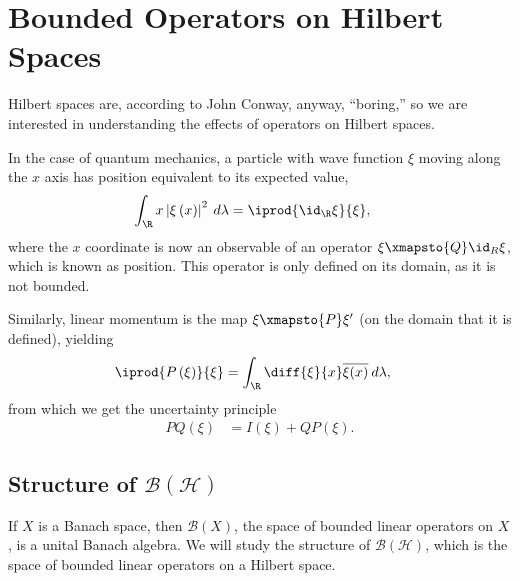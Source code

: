 \documentclass[10pt]{mypackage}
\begin{document}
\section{Bounded Operators on Hilbert Spaces}%
Hilbert spaces are, according to John Conway, anyway, ``boring,'' so we are interested in understanding the effects of operators on Hilbert spaces.\newline

In the case of quantum mechanics, a particle with wave function $\xi$ moving along the $x$ axis has position equivalent to its expected value,
\begin{align*}
  \int_{\R}^{} x \left\vert \xi\left(x\right) \right\vert^2\:d\lambda &= \iprod{\id_{\R} \xi}{\xi},
\end{align*}
where the $x$ coordinate is now an observable of an operator $\xi\xmapsto{Q} \id_{R}\xi$, which is known as position. This operator is only defined on its domain, as it is not bounded.\newline

Similarly, linear momentum is the map $\xi\xmapsto{P} \xi'$ (on the domain that it is defined), yielding
\begin{align*}
  \iprod{P\left(\xi\right)}{\xi} &= \int_{\R}^{} \diff{\xi}{x}\overline{\xi(x)}\:d\lambda,
\end{align*}
from which we get the uncertainty principle
\begin{align*}
  PQ\left(\xi\right) &= I\left(\xi\right) + QP\left(\xi\right).
\end{align*}
\subsection{Structure of $\mathcal{B}\left(\mathcal{H}\right)$}%
If $X$ is a Banach space, then $\mathcal{B}\left(X\right)$, the space of bounded linear operators on $X$, is a unital Banach algebra. We will study the structure of $\mathcal{B}\left(\mathcal{H}\right)$, which is the space of bounded linear operators on a Hilbert space.
\end{document}
